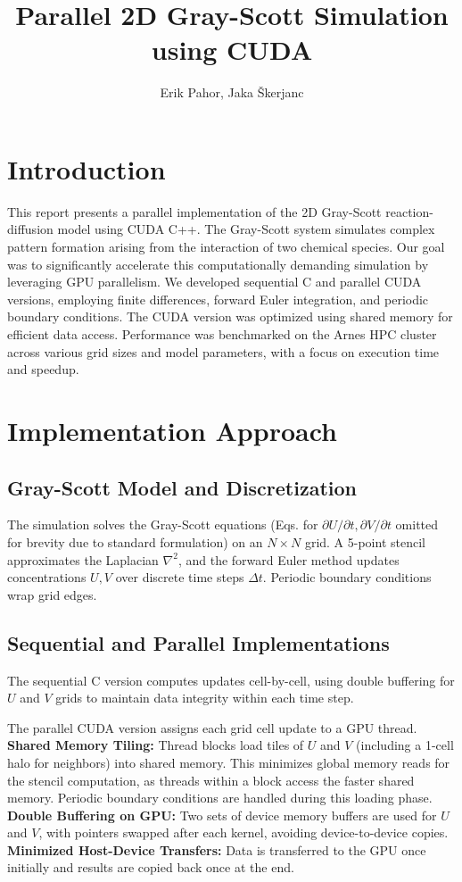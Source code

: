 \documentclass[9pt]{IEEEtran} %
\title{\vspace{0ex}
Parallel 2D Gray-Scott Simulation using CUDA}
\author{Erik Pahor, Jaka Škerjanc\vspace{-3.5ex}}
\begin{document}
\maketitle
\thispagestyle{empty} %

\section{Introduction}
\label{sec:introduction}

This report presents a parallel implementation of the 2D Gray-Scott reaction-diffusion model using CUDA C++. The Gray-Scott system simulates complex pattern formation arising from the interaction of two chemical species. Our goal was to significantly accelerate this computationally demanding simulation by leveraging GPU parallelism. We developed sequential C and parallel CUDA versions, employing finite differences, forward Euler integration, and periodic boundary conditions. The CUDA version was optimized using shared memory for efficient data access. Performance was benchmarked on the Arnes HPC cluster across various grid sizes and model parameters, with a focus on execution time and speedup.

\section{Implementation Approach}
\label{sec:implementation}

\subsection{Gray-Scott Model and Discretization}
The simulation solves the Gray-Scott equations (Eqs. for $\partial U/\partial t, \partial V/\partial t$ omitted for brevity due to standard formulation) on an $N \times N$ grid. A 5-point stencil approximates the Laplacian $\nabla^2$, and the forward Euler method updates concentrations $U, V$ over discrete time steps $\Delta t$. Periodic boundary conditions wrap grid edges.

\subsection{Sequential and Parallel Implementations}
The sequential C version computes updates cell-by-cell, using double buffering for $U$ and $V$ grids to maintain data integrity within each time step.

The parallel CUDA version assigns each grid cell update to a GPU thread.
\textbf{Shared Memory Tiling:} Thread blocks load tiles of $U$ and $V$ (including a 1-cell halo for neighbors) into shared memory. This minimizes global memory reads for the stencil computation, as threads within a block access the faster shared memory. Periodic boundary conditions are handled during this loading phase.
\textbf{Double Buffering on GPU:} Two sets of device memory buffers are used for $U$ and $V$, with pointers swapped after each kernel, avoiding device-to-device copies.
\textbf{Minimized Host-Device Transfers:} Data is transferred to the GPU once initially and results are copied back once at the end.
\end{document}
